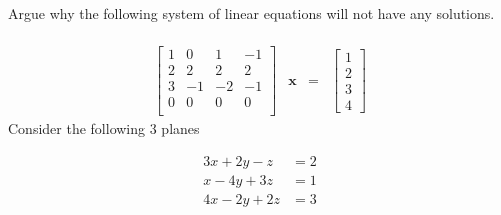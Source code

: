 \documentclass[solution,addpoints,12pt]{exam}
\begin{document}
\begin{questions}

\question[1] Argue why the following system of linear equations will not have any solutions.\\~\\

$$\begin{matrix}
\begin{bmatrix}
1 & 0 & 1 & -1 \\
2 & 2 & 2 & 2 \\
3 & -1 & -2 & -1 \\
0 & 0 & 0 & 0 \\
\end{bmatrix} & \mathbf{x} & = &
\begin{bmatrix}
1 \\
2 \\
3 \\
4
\end{bmatrix}
\end{matrix}
$$
\question Consider the following 3 planes 

\begin{align*}
3x + 2y - z &= 2 \\
x - 4y + 3z &= 1 \\
4x - 2y + 2z &= 3 
\end{align*}


\end{questions}
\end{document}
